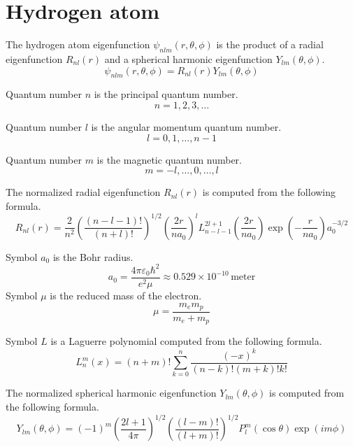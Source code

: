 

\section*{Hydrogen atom}

The hydrogen atom eigenfunction $\psi_{nlm}(r,\theta,\phi)$
is the product of a radial eigenfunction $R_{nl}(r)$ and a spherical
harmonic eigenfunction $Y_{lm}(\theta,\phi)$.
\begin{equation*}
\psi_{nlm}(r,\theta,\phi)=R_{nl}(r)Y_{lm}(\theta,\phi)
\end{equation*}

Quantum number $n$ is the principal quantum number.
\begin{equation*}
n=1,2,3,\ldots
\end{equation*}

Quantum number $l$ is the angular momentum quantum number.
\begin{equation*}
l=0,1,\ldots,n-1
\end{equation*}

Quantum number $m$ is the magnetic quantum number.
\begin{equation*}
m=-l,\ldots,0,\ldots,l
\end{equation*}

The normalized radial eigenfunction $R_{nl}(r)$ is computed from the following formula.
\begin{equation*}
R_{nl}(r)=
\frac{2}{n^2}
\left(\frac{(n-l-1)!}{(n+l)!}\right)^{1/2}
\left(\frac{2r}{na_0}\right)^l
L_{n-l-1}^{2l+1}\left(\frac{2r}{na_0}\right)
\exp\left(-\frac{r}{na_0}\right)
a_0^{-3/2}
\end{equation*}

Symbol $a_0$ is the Bohr radius.
\begin{equation*}
a_0=\frac{4\pi\varepsilon_0\hbar^2}{e^2\mu}
\approx0.529\times10^{-10}\,\text{meter}
\end{equation*}
Symbol $\mu$ is the reduced mass of the electron.
\begin{equation*}
\mu=\frac{m_e m_p}{m_e+m_p}
\end{equation*}

Symbol $L$ is a Laguerre polynomial computed from the following formula.
\begin{equation*}
L_n^m(x)=(n+m)!\sum_{k=0}^n
\frac{(-x)^k}{(n-k)!(m+k)!k!}
\end{equation*}

The normalized spherical harmonic eigenfunction $Y_{lm}(\theta,\phi)$
is computed from the following formula.
\begin{equation*}
Y_{lm}(\theta,\phi)=(-1)^m
\left(\frac{2l+1}{4\pi}\right)^{1/2}
\left(\frac{(l-m)!}{(l+m)!}\right)^{1/2}
P_l^m(\cos\theta)\exp(im\phi)
\end{equation*}

